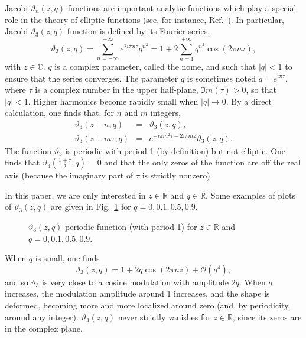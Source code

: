 \documentclass[]{revtex4-1}
\begin{document}
Jacobi $\vartheta_n(z,q)$-functions are important analytic functions which play a special role in the theory of elliptic functions (see, for instance, Ref.~\cite{dlmf}). In particular, Jacobi $\vartheta_3(z,q)$ function is defined by its Fourier series,
\begin{equation}
\vartheta_3(z,q)= \sum_{n=-\infty}^{+\infty} e^{2i\pi n z  } q^{n^2} = 1 + 2\sum_{n=1}^{+\infty} q^{n^2} \cos(2\pi n z),
\end{equation}
with $z \in \mathbb{C}$. $q$ is a complex parameter, called the nome, and such that $|q|<1$ to ensure that the series converges. The parameter $q$ is sometimes noted $q=e^{i\pi \tau}$, where $\tau$ is a complex number in the upper half-plane, $\Im m (\tau)>0$, so that $|q|<1$. Higher harmonics become rapidly small when $|q| \rightarrow 0$. By a direct calculation, one finds that, for $n$ and $m$ integers, 
\begin{eqnarray}
  \vartheta_3(z+n,q)&=&\vartheta_3(z,q), \\
  \vartheta_3(z+m \tau,q)&=& e^{-i\pi m^2 \tau -2i\pi m z} \vartheta_3(z,q).
\end{eqnarray}
The function $ \vartheta_3$ is periodic with period 1 (by definition) but not elliptic. One finds that $\vartheta_3(\frac{1+\tau}{2},q)=0$ and that the only zeros of the function are off the real axis (because the imaginary part of $\tau$ is strictly nonzero). 

In this paper, we are  only interested in $z \in \mathbb{R}$ and $q \in \mathbb{R}$. Some examples of plots of $\vartheta_3(z,q)$ are given in Fig.~\ref{theta3} for $q=0,0.1,0.5,0.9$.
\begin{figure}[!h]
       \begin{center} 
\end{center} \caption{$\vartheta_3(z,q)$ periodic function (with period 1) for $z \in \mathbb{R} $ and $q=0,0.1,0.5,0.9$.}
  \label{theta3}
\end{figure}

When $q$ is small, one finds
\begin{equation}
\vartheta_3(z,q )=  1 + 2 q \cos(2\pi n z) + \mathcal{O}(q^4),
\end{equation}
and so $\vartheta_3$ is very close to a cosine modulation with amplitude $2q$. When $q$ increases, the modulation amplitude around 1 increases, and the shape is deformed, becoming more and more localized around zero (and, by periodicity, around any integer). $\vartheta_3(z,q)$ never strictly vanishes for $z \in \mathbb{R}$, since its zeros are in the complex plane.
\end{document}
